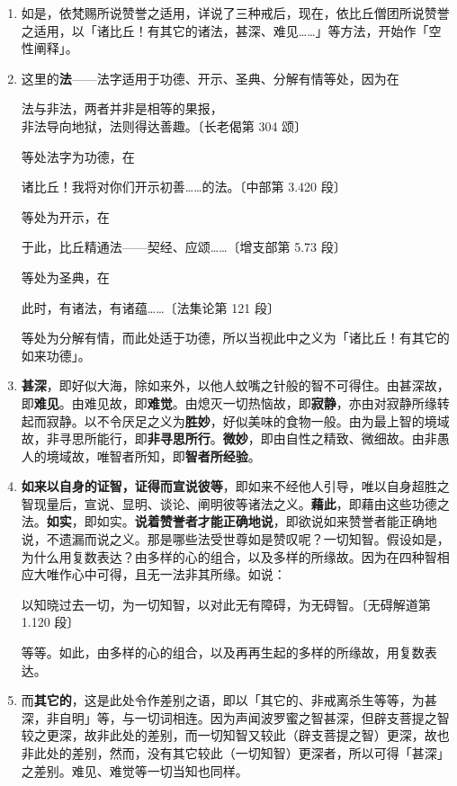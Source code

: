 \begin{enumerate}\item 如是，依梵赐所说赞誉之适用，详说了三种戒后，现在，依比丘僧团所说赞誉之适用，以「诸比丘！有其它的诸法，甚深、难见……」等方法，开始作「空性阐释」。
\item 这里的\textbf{法}——法字适用于功德、开示、圣典、分解有情等处，因为在\begin{quoting}法与非法，两者并非是相等的果报，\\非法导向地狱，法则得达善趣。{\bluefootnotesize 〔长老偈第 304 颂〕}\end{quoting}等处法字为功德，在\begin{quoting}诸比丘！我将对你们开示初善……的法。{\bluefootnotesize 〔中部第 3.420 段〕}\end{quoting}等处为开示，在\begin{quoting}于此，比丘精通法——契经、应颂……{\bluefootnotesize 〔增支部第 5.73 段〕}\end{quoting}等处为圣典，在\begin{quoting}此时，有诸法，有诸蕴……{\bluefootnotesize 〔法集论第 121 段〕}\end{quoting}等处为分解有情，而此处适于功德，所以当视此中之义为「诸比丘！有其它的如来功德」。
\item \textbf{甚深}，即好似大海，除如来外，以他人蚊嘴之针般的智不可得住。由甚深故，即\textbf{难见}。由难见故，即\textbf{难觉}。由熄灭一切热恼故，即\textbf{寂静}，亦由对寂静所缘转起而寂静。以不令厌足之义为\textbf{胜妙}，好似美味的食物一般。由为最上智的境域故，非寻思所能行，即\textbf{非寻思所行}。\textbf{微妙}，即由自性之精致、微细故。由非愚人的境域故，唯智者所知，即\textbf{智者所经验}。
\item \textbf{如来以自身的证智，证得而宣说彼等}，即如来不经他人引导，唯以自身超胜之智现量后，宣说、显明、谈论、阐明彼等诸法之义。\textbf{藉此}，即藉由这些功德之法。\textbf{如实}，即如实。\textbf{说着赞誉者才能正确地说}，即欲说如来赞誉者能正确地说，不遗漏而说之义。那是哪些法受世尊如是赞叹呢？一切知智。假设如是，为什么用复数表达？由多样的心的组合，以及多样的所缘故。因为在四种智相应大唯作心中可得，且无一法非其所缘。如说：\begin{quoting}以知晓过去一切，为一切知智，以对此无有障碍，为无碍智。{\bluefootnotesize 〔无碍解道第 1.120 段〕}\end{quoting}等等。如此，由多样的心的组合，以及再再生起的多样的所缘故，用复数表达。
\item 而\textbf{其它的}，这是此处令作差别之语，即以「其它的、非戒离杀生等等，为甚深，非自明」等，与一切词相连。因为声闻波罗蜜之智甚深，但辟支菩提之智较之更深，故非此处的差别，而一切知智又较此（辟支菩提之智）更深，故也非此处的差别，然而，没有其它较此（一切知智）更深者，所以可得「甚深」之差别。难见、难觉等一切当知也同样。

\end{enumerate}
